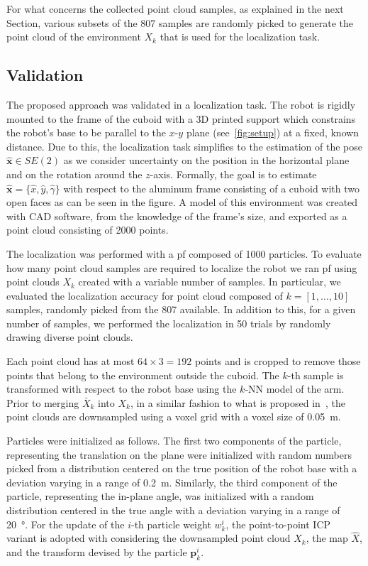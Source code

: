 For what concerns the collected point cloud samples, as explained in the next Section, various subsets of the 807 samples are randomly picked to generate the point cloud of the environment $X_k$ that is used for the localization task.

\subsection{Validation}

The proposed approach was validated in a localization task. The robot is rigidly mounted to the frame of the cuboid with a 3D printed support which constrains the robot's base to be parallel to the $x$-$y$ plane (see~\cref{fig:setup})
at a fixed, known distance. Due to this, the localization task simplifies to the estimation of the pose $\hat{\mathbf{x}}\in SE(2)$ as we consider uncertainty on the position in the horizontal plane and on the rotation around the $z$-axis. Formally, the goal is to estimate  $\hat{\mathbf{x}} = \lbrace \hat{x}, \hat{y}, \hat{\gamma} \rbrace$  with respect to the aluminum frame consisting of a cuboid with two open faces as can be seen in the figure.
%  
A model of this environment was created with CAD software, from the knowledge of the frame's size, and exported as a point cloud consisting of 2000 points. 
%

The localization was performed with a \gls{pf} composed of 1000 particles. 
To evaluate how many point cloud samples are required to localize the robot we ran \gls{pf} using point clouds $X_k$ created with a variable number of samples. In particular, we evaluated the localization accuracy for point cloud composed of $k =[1, \dots, 10 ]$ samples, randomly picked from the 807 available. In addition to this, for a given number of samples, we performed the localization in 50 trials by randomly drawing diverse point clouds. 

Each point cloud has at most $64\times3 = 192$ points and is cropped to remove those points that belong to the environment outside the cuboid. The $k$-th sample is transformed with respect to the robot base using the $k$-NN model of the arm. Prior to merging $\bar{X}_k$ into $X_k$, in a similar fashion to what is proposed in~\cite{vizzo2023kiss}, the point clouds are downsampled using a voxel grid with a voxel size of \SI{0.05}{m}.

Particles were initialized as follows. The first two components of the particle, representing the translation on the plane were initialized with random numbers picked from a distribution centered on the true position of the robot base with a deviation varying in a range of \SI{0.2}{\meter}. Similarly, the third component of the particle, representing the in-plane angle, was initialized with a random distribution centered in the true angle with a deviation varying in a range of \SI{20}{\degree}.
%
For the update of the $i$-th particle weight $w_k^i$, the point-to-point ICP variant is adopted with considering the downsampled point cloud $X_k$, the map $\hat{X}$, and the transform devised by the particle $\mathbf{p}_k^i$.

